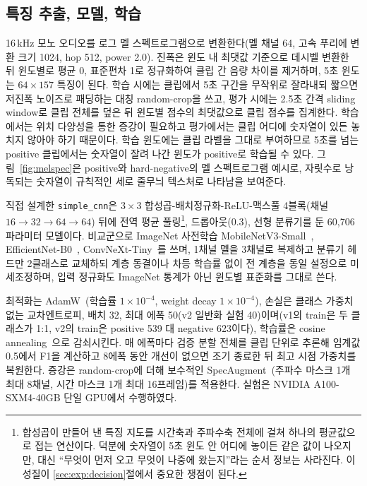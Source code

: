 \documentclass[10pt,twocolumn]{article}
\begin{document}
\subsection{특징 추출, 모델, 학습}
16\,kHz 모노 오디오를 로그 멜 스펙트로그램으로 변환한다(멜 채널 64, 고속 푸리에 변환 크기
1024, hop 512, power 2.0). 진폭은 윈도 내 최댓값 기준으로 데시벨 변환한 뒤 윈도별로 평균 0,
표준편차 1로 정규화하여 클립 간 음량 차이를 제거하며, 5초 윈도는 $64\times157$ 특징이 된다.
학습 시에는 클립에서 5초 구간을 무작위로 잘라내되 짧으면 저진폭 노이즈로 패딩하는 대칭
random-crop을 쓰고, 평가 시에는 2.5초 간격 sliding window로 클립 전체를 덮은 뒤 윈도별 점수의
최댓값으로 클립 점수를 집계한다. 학습에서는 위치 다양성을 통한 증강이 필요하고 평가에서는 클립
어디에 숫자열이 있든 놓치지 않아야 하기 때문이다. 학습 윈도에는 클립 라벨을 그대로 부여하므로
5초를 넘는 positive 클립에서는 숫자열이 잘려 나간 윈도가 positive로 학습될 수 있다. 그림~\ref{fig:melspec}은 positive와
hard-negative의 멜 스펙트로그램 예시로, 자릿수로 낭독되는 숫자열이 규칙적인 세로 줄무늬
텍스처로 나타남을 보여준다.

직접 설계한 \texttt{simple\_cnn}은 $3\times3$ 합성곱-배치정규화-ReLU-맥스풀 4블록(채널
$16\to32\to64\to64$) 뒤에 전역 평균 풀링\footnote{합성곱이 만들어 낸 특징 지도를 시간축과
주파수축 전체에 걸쳐 하나의 평균값으로 접는 연산이다. 덕분에 숫자열이 5초 윈도 안 어디에
놓이든 같은 값이 나오지만, 대신 ``무엇이 먼저 오고 무엇이 나중에 왔는지''라는 순서 정보는
사라진다. 이 성질이 \ref{sec:exp:decision}절에서 중요한 쟁점이 된다.}, 드롭아웃(0.3), 선형
분류기를 둔 60{,}706 파라미터 모델이다. 비교군으로 ImageNet
사전학습 MobileNetV3-Small~\cite{howard2019mobilenetv3},
EfficientNet-B0~\cite{tan2019efficientnet}, ConvNeXt-Tiny~\cite{liu2022convnext}를 쓰며, 1채널
멜을 3채널로 복제하고 분류기 헤드만 2클래스로 교체하되 계층 동결이나 차등 학습률 없이 전
계층을 동일 설정으로 미세조정하며, 입력 정규화도 ImageNet 통계가 아닌 윈도별 표준화를 그대로
쓴다.

최적화는 AdamW~\cite{loshchilov2019adamw}(학습률 $1\times10^{-4}$, weight decay
$1\times10^{-4}$), 손실은 클래스 가중치 없는 교차엔트로피, 배치 32, 최대 에폭 50(v2 일반화
실험 40)이며(v1의 train은 두 클래스가 1:1, v2의 train은 positive 539 대 negative 623이다), 학습률은 cosine annealing~\cite{loshchilov2017sgdr}으로 감쇠시킨다. 매 에폭마다
검증 분할 전체를 클립 단위로 추론해 임계값 0.5에서 F1을 계산하고 8에폭 동안 개선이 없으면 조기
종료한 뒤 최고 시점 가중치를 복원한다. 증강은 random-crop에 더해 보수적인
SpecAugment~\cite{park2019specaugment}(주파수 마스크 1개 최대 8채널, 시간 마스크 1개 최대
16프레임)를 적용한다. 실험은 NVIDIA A100-SXM4-40GB 단일 GPU에서 수행하였다.
\end{document}

